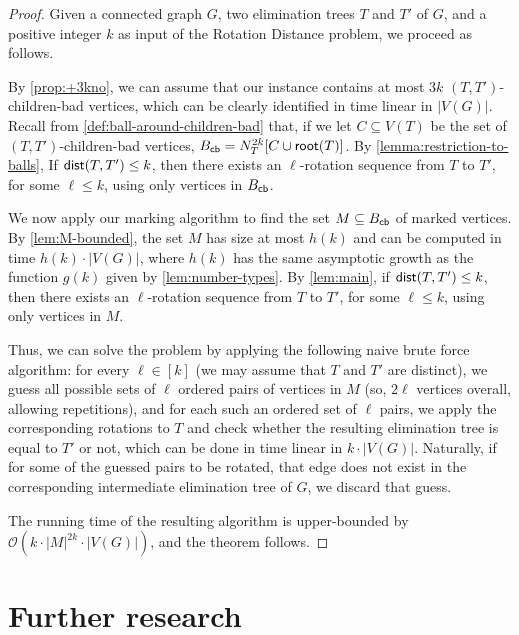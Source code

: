 \documentclass[a4paper,UKenglish,cleveref, autoref, thm-restate]{lipics-v2021}
\renewcommand{\root}{{\sf root}\xspace}
\newcommand{\dist}{{\sf dist}\xspace}
\newcommand{\Bcb}{B_{\sf cb}\xspace}
\newcommand{\Ocal}{{\mathcal O}\xspace}
\newcommand{\kelimination}{{\sc Rotation Distance}\xspace}
\begin{document}
\begin{proof}
Given a connected graph $G$, two elimination trees $T$ and $T'$ of $G$, and a positive integer $k$ as input of the \kelimination problem, we proceed as follows.

By \autoref{prop:+3kno}, we can assume that our instance contains at most $3k$ $(T,T')$-children-bad vertices, which can be clearly identified in time linear in $|V(G)|$. Recall from \autoref{def:ball-around-children-bad} that, if we
let $C \subseteq V(T)$ be the set of $(T,T')$-children-bad vertices,
$\Bcb = N_T^{2k}[C \cup \root(T)]$. By \autoref{lemma:restriction-to-balls},
If $\dist(T,T')\leq k$, then there exists an $\ell$-rotation sequence from $T$ to $T'$, for some $\ell \leq k$, using only vertices in $\Bcb$.

We now apply our marking algorithm to find the set $M \subseteq \Bcb$ of marked vertices. By \autoref{lem:M-bounded}, the set $M$ has size at most $h(k)$ and can be computed in time $h(k) \cdot |V(G)|$,
where  $h(k)$ has the same asymptotic growth as the function $g(k)$ given by \autoref{lem:number-types}. By \autoref{lem:main}, if $\dist(T,T')\leq k$, then there exists an $\ell$-rotation sequence from $T$ to $T'$, for some $\ell \leq k$, using only vertices in $M$.

Thus, we can solve the problem by applying the following naive brute force algorithm: for every $\ell \in [k]$ (we may assume that $T$ and $T'$ are distinct), we guess all possible sets of $\ell$ ordered pairs of vertices in $M$ (so, $2 \ell$ vertices overall, allowing repetitions), and for each such an ordered set of $\ell$ pairs, we apply the corresponding rotations to $T$ and check whether the resulting elimination tree is equal to $T'$ or not, which can be done in time linear in $k \cdot |V(G)|$. Naturally, if for some of the guessed pairs to be rotated, that edge does not exist in the corresponding intermediate elimination tree of $G$, we discard that guess.

The running time of the resulting algorithm is upper-bounded by $\Ocal(k \cdot |M|^{2k} \cdot |V(G)|)$, and the theorem follows.
\end{proof}












\section{Further research}
\label{sec:discussion}
\end{document}
